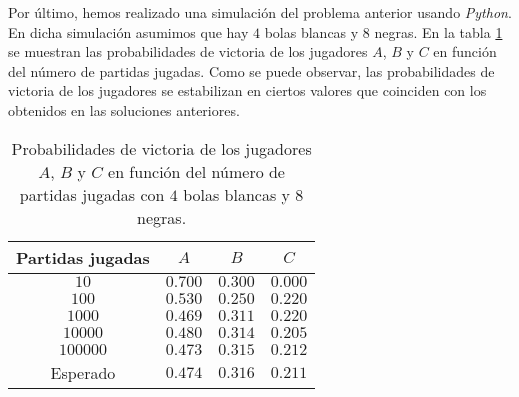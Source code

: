 Por último, hemos realizado una simulación del problema anterior usando
\textit{Python}. En dicha simulación asumimos que hay $4$ bolas blancas y
$8$ negras. En la tabla \ref{tab:probabilidades_huygens2} se muestran
las probabilidades de victoria de los jugadores $A$, $B$ y $C$ en función
del número de partidas jugadas. Como se puede observar, las probabilidades
de victoria de los jugadores se estabilizan en ciertos valores que
coinciden con los obtenidos en las soluciones anteriores.

\begin{table}
  \centering
  \begin{tabular}{cccc}
    \toprule
    Partidas jugadas & $A$ & $B$ & $C$ \\
    \midrule
    $10$ & $0.700$ & $0.300$ & $0.000$ \\
    $100$ & $0.530$ & $0.250$ & $0.220$ \\
    $1000$ & $0.469$ & $0.311$ & $0.220$ \\
    $10000$ & $0.480$ & $0.314$ & $0.205$ \\
    $100000$ & $0.473$ & $0.315$ & $0.212$ \\
    \midrule
    Esperado & $0.474$ & $0.316$ & $0.211$ \\
    \bottomrule
  \end{tabular}
  \caption{Probabilidades de victoria de los jugadores $A$, $B$ y $C$ en
  función del número de partidas jugadas con $4$ bolas blancas y $8$
  negras.}
  \label{tab:probabilidades_huygens2}
\end{table}
